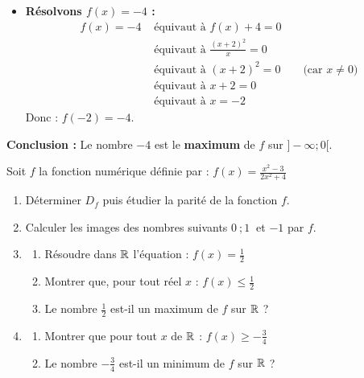 \documentclass[10pt, a4paper]{article}
\begin{document}
\begin{Solution}[APPLICATION][15]
\begin{enumerate}[leftmargin=*,itemsep=1pt]
\begin{itemize}[leftmargin=*,itemsep=0.5pt]
        \item \textbf{Résolvons $f(x) = -4$ :}
        \begin{align*}
            f(x) = -4
            &\text{ équivaut à } f(x) + 4 = 0 \\
            &\text{ équivaut à } \frac{(x + 2)^2}{x} = 0 \\
            &\text{ équivaut à } (x + 2)^2 = 0 \qquad \text{(car $x \neq 0$)} \\
            &\text{ équivaut à } x + 2 = 0 \\
            &\text{ équivaut à } x = -2
        \end{align*}
    Donc : $f(-2) = -4$.
    \end{itemize}

    \textbf{Conclusion :} Le nombre $-4$ est le \textbf{maximum} de $f$ sur $\big]-\infty ; 0\big[$.
\end{enumerate}
\end{Solution}


\begin{Application}[][45 min]
Soit $f$ la fonction numérique définie par : \quad
$f(x) = \frac{x^2 - 3}{2x^2 + 4}$

\begin{enumerate}[leftmargin=*,itemsep=0.5pt]
  \item Déterminer $D_f$ puis étudier la parité de la fonction $f$.
  \item Calculer les images des nombres suivants $0 \ ; 1 \ $ et $ -1$ par $f$.
  \item
  \begin{enumerate}[leftmargin=*,itemsep=0.5pt]
    \item Résoudre dans $\mathbb{R}$ l'équation : $f(x) = \frac{1}{2}$
    \item Montrer que, pour tout réel $x$ : $f(x) \leqslant \frac{1}{2}$
    \item Le nombre $\frac{1}{2}$ est-il un maximum de $f$ sur $\mathbb{R}$ ?
  \end{enumerate}
  \item
  \begin{enumerate}[leftmargin=*,itemsep=0.5pt]
    \item Montrer que pour tout $x$ de $\mathbb{R}$ : $f(x) \geqslant -\frac{3}{4}$
    \item Le nombre $-\frac{3}{4}$ est-il un minimum de $f$ sur $\mathbb{R}$ ?
  \end{enumerate}
\end{enumerate}
\end{Application}
\end{document}
